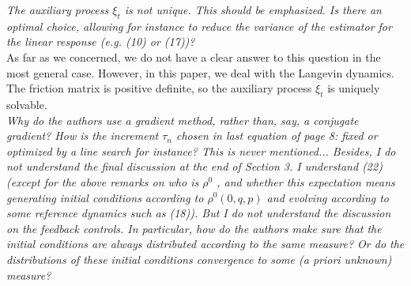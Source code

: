 \documentclass[]{revtex4-1}
\begin{document}

\emph{
  The auxiliary process $\xi_t$ is not unique. This should be emphasized. Is there an optimal
choice, allowing for instance to reduce the variance of the estimator for the linear response
(e.g. (10) or (17))?
}\\

As far as we concerned, we do not have a clear answer to this question
in the most general case.
However, in this paper, we deal with  the Langevin dynamics.
The friction
matrix is positive definite, so the auxiliary process $\xi_t$ is uniquely
solvable.
\\

\emph{
Why do the authors use a gradient method, rather than, say, a
conjugate gradient? How is the increment $\tau_n$ chosen in last equation of
page 8: fixed or optimized by a line search for instance? This is
never mentioned... Besides, I do not understand the final discussion
at the end of Section 3. I understand (22) (except for the above
remarks on who is $\rho^0$ , and whether this expectation means generating
initial conditions according to $\rho^0 (0, q, p)$ and evolving according to
some reference dynamics such as (18)). But I do not understand the
discussion on the feedback controls. In particular, how do the authors
make sure that the initial conditions are always distributed according
to the same measure? Or do the distributions of these initial
conditions convergence to some (a priori unknown) measure?
}\\
\end{document}

